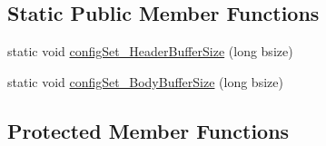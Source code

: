 \subsection*{Static Public Member Functions}
\begin{DoxyCompactItemize}
\item 
static void \hyperlink{class_message_reader_ab80bdac9cbb3d446a6d8b5e944ba3bfe}{config\+Set\+\_\+\+Header\+Buffer\+Size} (long bsize)
\item 
static void \hyperlink{class_message_reader_a83e245590821f3c60de01f698febac25}{config\+Set\+\_\+\+Body\+Buffer\+Size} (long bsize)
\end{DoxyCompactItemize}
\subsection*{Protected Member Functions}
